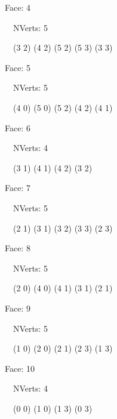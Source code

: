\documentclass{article}
\begin{document}
    {\footnotesize

    Face: 4

    \   \    NVerts: 5

     \   \   (3 2) (4 2) (5 2) (5 3) (3 3)}

    {\footnotesize

    Face: 5

    \   \    NVerts: 5

     \   \   (4 0) (5 0) (5 2) (4 2) (4 1)}

    {\footnotesize

    Face: 6

    \   \    NVerts: 4

     \   \   (3 1) (4 1) (4 2) (3 2)}

    {\footnotesize

    Face: 7

    \   \    NVerts: 5

     \   \   (2 1) (3 1) (3 2) (3 3) (2 3)}

    {\footnotesize

    Face: 8

    \   \    NVerts: 5

     \   \   (2 0) (4 0) (4 1) (3 1) (2 1)}

    {\footnotesize

    Face: 9

    \   \    NVerts: 5

     \   \   (1 0) (2 0) (2 1) (2 3) (1 3)}

    {\footnotesize

    Face: 10

    \   \    NVerts: 4

     \   \   (0 0) (1 0) (1 3) (0 3)}


     \newpage
\end{document}

